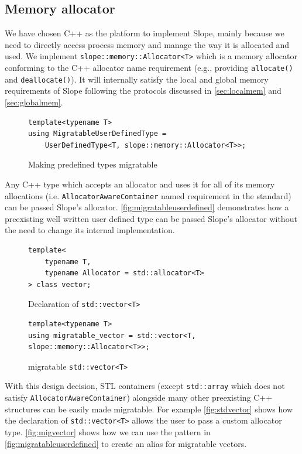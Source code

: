 \subsection{Memory allocator}
\label{sec:platform}
We have chosen C++ as the platform to implement Slope, mainly because we need
to directly access process memory and manage the way it is allocated and used.
We implement \texttt{slope::memory::Allocator<T>} which is a memory allocator
conforming to the C++ allocator name requirement (e.g., providing
\texttt{allocate()} and \texttt{deallocate()}). It will internally satisfy the
local and global memory requirements of Slope following the protocols discussed
in \autoref{sec:localmem} and \autoref{sec:globalmem}.

\begin{figure}[t]
\begin{lstlisting}
template<typename T>
using MigratableUserDefinedType =
    UserDefinedType<T, slope::memory::Allocator<T>>;
\end{lstlisting}
\caption{
    Making predefined types migratable
}
\label{fig:migratableuserdefined}
\end{figure}

Any C++ type which accepts an allocator and uses it for all of its memory
allocations (i.e. \texttt{AllocatorAwareContainer} named requirement in the standard)
can be passed Slope's allocator. \autoref{fig:migratableuserdefined}
demonstrates how a preexisting well written user defined type can be
passed Slope's allocator without the need to change its internal implementation.

\begin{figure}[t]
\begin{lstlisting}
template<
    typename T,
    typename Allocator = std::allocator<T>
> class vector;
\end{lstlisting}
\caption{
    Declaration of \texttt{std::vector<T>}
}
\label{fig:stdvector}
\end{figure}


\begin{figure}[t]
\begin{lstlisting}
template<typename T>
using migratable_vector = std::vector<T, slope::memory::Allocator<T>>;

\end{lstlisting}
\caption{
    migratable \texttt{std::vector<T>}
}
\label{fig:migvector}
\end{figure}


With this design decision, STL containers (except \texttt{std::array} which
does not satisfy \texttt{AllocatorAwareContainer}) alongside many other preexisting
C++ structures can be easily made migratable.
For example \autoref{fig:stdvector} shows how the declaration of
\texttt{std::vector<T>}
allows the user to pass a custom allocator type. \autoref{fig:migvector} shows
how we can use the pattern in \autoref{fig:migratableuserdefined} to create
an alias for migratable vectors.



